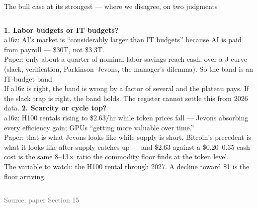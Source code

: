 \documentclass[aspectratio=169,11pt]{beamer}
\newcommand{\src}[1]{\vfill\hfill{\scriptsize\textcolor{gray}{Source: #1}}}
\newcommand{\claim}[1]{\par\vspace{2pt}{\small\textcolor{accent}{#1}}\par}
\begin{document}
\begin{frame}{The bull case at its strongest --- where we disagree, on two judgments}
\footnotesize
\claim{Not on the numbers: on who pays, and on whether rising compute prices are permanent.}
\begin{columns}[T]
\small
\textbf{1. Labor budgets or IT budgets?}\\[4pt]
a16z: AI's market is ``considerably larger than IT budgets'' because AI is paid from payroll --- \$30T, not \$3.3T.\\[4pt]
Paper: only about a quarter of nominal labor savings reach cash, over a J-curve (slack, verification, Parkinson--Jevons, the manager's dilemma). So the band is an IT-budget band.\\[4pt]
If a16z is right, the band is wrong by a factor of several and the plateau pays. If the slack trap is right, the band holds. The register cannot settle this from 2026 data.
\small
\textbf{2. Scarcity or cycle top?}\\[4pt]
a16z: H100 rentals rising to \$2.63/hr while token prices fall --- Jevons absorbing every efficiency gain; GPUs ``getting more valuable over time.''\\[4pt]
Paper: that is what Jevons looks like while supply is short. Bitcoin's precedent is what it looks like after supply catches up --- and \$2.63 against a \$0.20--0.35 cash cost is the same 8--13$\times$ ratio the commodity floor finds at the token level.\\[4pt]
The variable to watch: the H100 rental through 2027. A decline toward \$1 is the floor arriving.
\end{columns}
\src{paper Section 15}
\end{frame}
\end{document}

